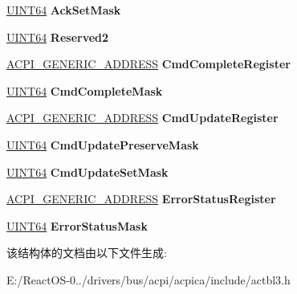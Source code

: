 \begin{DoxyCompactItemize}
\mbox{\label{structacpi__pcct__ext__pcc__slave_a8b182f8810e333276584bd33315dcbaf}} 
\hyperlink{_processor_bind_8h_a57be03562867144161c1bfee95ca8f7c}{U\+I\+N\+T64} {\bfseries Ack\+Set\+Mask}
\item 
\mbox{\label{structacpi__pcct__ext__pcc__slave_a7bbd32704e2ade266823cb9219b9a15b}} 
\hyperlink{_processor_bind_8h_a57be03562867144161c1bfee95ca8f7c}{U\+I\+N\+T64} {\bfseries Reserved2}
\item 
\mbox{\label{structacpi__pcct__ext__pcc__slave_a2622c96a4452a2b15545622a733e1a3d}} 
\hyperlink{structacpi__generic__address}{A\+C\+P\+I\+\_\+\+G\+E\+N\+E\+R\+I\+C\+\_\+\+A\+D\+D\+R\+E\+SS} {\bfseries Cmd\+Complete\+Register}
\item 
\mbox{\label{structacpi__pcct__ext__pcc__slave_a2b096084f74f5d18c47644b21bb1b68b}} 
\hyperlink{_processor_bind_8h_a57be03562867144161c1bfee95ca8f7c}{U\+I\+N\+T64} {\bfseries Cmd\+Complete\+Mask}
\item 
\mbox{\label{structacpi__pcct__ext__pcc__slave_ae269d7bcb589b47f5672f4a49a043803}} 
\hyperlink{structacpi__generic__address}{A\+C\+P\+I\+\_\+\+G\+E\+N\+E\+R\+I\+C\+\_\+\+A\+D\+D\+R\+E\+SS} {\bfseries Cmd\+Update\+Register}
\item 
\mbox{\label{structacpi__pcct__ext__pcc__slave_a0bb728b8b463de9a7bd970eff4e49406}} 
\hyperlink{_processor_bind_8h_a57be03562867144161c1bfee95ca8f7c}{U\+I\+N\+T64} {\bfseries Cmd\+Update\+Preserve\+Mask}
\item 
\mbox{\label{structacpi__pcct__ext__pcc__slave_a5ccb68c7c4f3e92504fe35789a374942}} 
\hyperlink{_processor_bind_8h_a57be03562867144161c1bfee95ca8f7c}{U\+I\+N\+T64} {\bfseries Cmd\+Update\+Set\+Mask}
\item 
\mbox{\label{structacpi__pcct__ext__pcc__slave_aea46bdab3e95daccd69ff29f925728c0}} 
\hyperlink{structacpi__generic__address}{A\+C\+P\+I\+\_\+\+G\+E\+N\+E\+R\+I\+C\+\_\+\+A\+D\+D\+R\+E\+SS} {\bfseries Error\+Status\+Register}
\item 
\mbox{\label{structacpi__pcct__ext__pcc__slave_ad9bebf68ba6ac01dc28ee170bc081d0d}} 
\hyperlink{_processor_bind_8h_a57be03562867144161c1bfee95ca8f7c}{U\+I\+N\+T64} {\bfseries Error\+Status\+Mask}
\end{DoxyCompactItemize}


该结构体的文档由以下文件生成\+:\begin{DoxyCompactItemize}
\item 
E\+:/\+React\+O\+S-\/0../drivers/bus/acpi/acpica/include/actbl3.\+h\end{DoxyCompactItemize}
